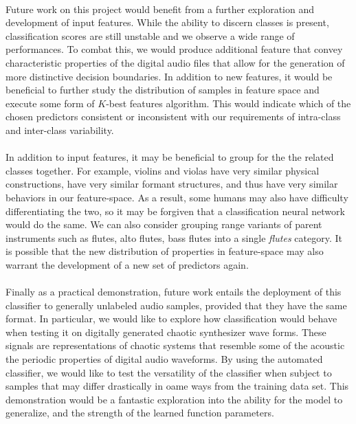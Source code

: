 \documentclass[12pt,letterpaper]{article}
\begin{document}
\paragraph*{}Future work on this project would benefit from a further exploration and development of input features. While the ability to discern classes is present, classification scores are still unstable and we observe a wide range of performances. To combat this, we would produce additional feature that convey characteristic properties of the digital audio files that allow for the generation of more distinctive decision boundaries. In addition to new features, it would be beneficial to further study the distribution of samples in feature space and execute some form of $K$-best features algorithm. This would indicate which of the  chosen predictors consistent or inconsistent with our requirements of intra-class and inter-class variability. 

\paragraph*{}In addition to input features, it may be beneficial to group for the the related classes together. For example, violins and violas have very similar physical constructions, have very similar formant structures, and thus have very similar behaviors in our feature-space. As a result, some humans may also have difficulty differentiating the two, so it may be forgiven that a classification neural network would do the same. We can also consider grouping range variants of parent instruments such as flutes, alto flutes, bass flutes into a single \textit{flutes} category. It is possible that the new distribution of properties in feature-space may also warrant the development of a new set of predictors again. 

\paragraph*{}Finally as a practical demonstration, future work entails the deployment of this classifier to generally unlabeled audio samples, provided that they have the same format. In particular, we would like to explore how classification would behave when testing it on digitally generated chaotic synthesizer wave forms. These signals are representations of chaotic systems that resemble some of the acoustic the periodic properties of digital audio waveforms. By using the automated classifier, we would like to test the versatility of the classifier when subject to samples that may differ drastically in oame ways from the training data set. This demonstration would be a fantastic exploration into the ability for the model to generalize, and the strength of the learned function parameters.
\end{document}
